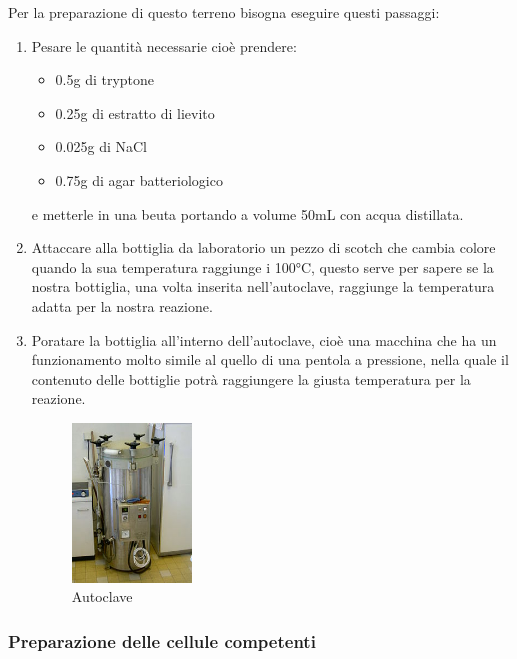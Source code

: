 Per la preparazione di questo terreno bisogna eseguire questi passaggi:

\begin{enumerate}

	\item Pesare le quantità necessarie cioè prendere:
  \begin{itemize}
    \item 0.5g di tryptone
    \item 0.25g di estratto di lievito
    \item 0.025g di NaCl
    \item 0.75g di agar batteriologico
  \end{itemize}
  e metterle in una beuta portando a volume 50mL con acqua distillata.
  \item Attaccare alla bottiglia da laboratorio un pezzo di scotch
  che cambia colore quando la sua temperatura
  raggiunge i 100°C, questo serve per sapere se la nostra bottiglia,
  una volta inserita nell'autoclave, raggiunge la
  temperatura adatta per la nostra reazione.

	\item Poratare la bottiglia all'interno dell'autoclave,
  cioè una macchina che ha un funzionamento molto simile al quello di una pentola a
  pressione, nella quale il contenuto delle bottiglie potrà raggiungere la
  giusta temperatura per la reazione.

  \begin{figure}[H]
		\centering
		\includegraphics[width=0.3\textwidth]{./immagini/autoclave.JPG}
		\caption{Autoclave}
		\label{autoclave}

	\end{figure}


\end{enumerate}

\subsubsection{Preparazione delle cellule competenti}

